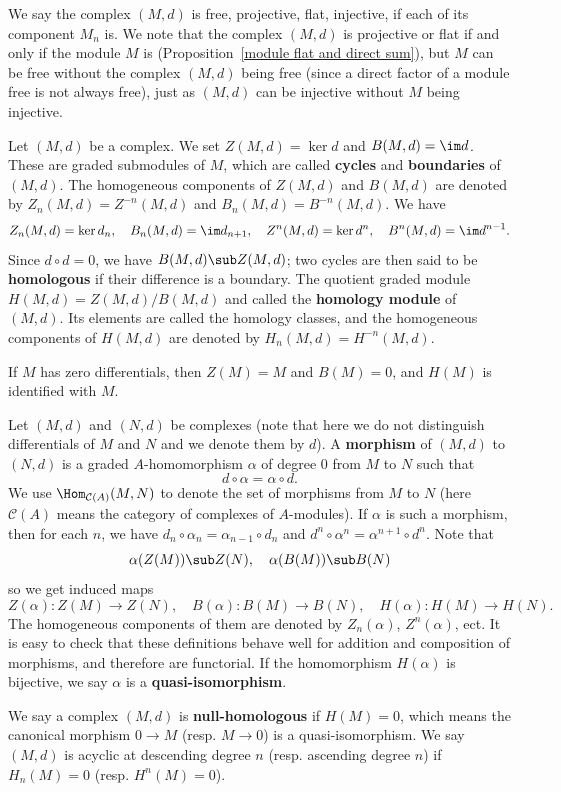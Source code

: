 We say the complex $(M,d)$ is free, projective, flat, injective, if each of its component $M_n$ is. We note that the complex $(M,d)$ is projective or flat if and only if the module $M$ is (Proposition~\ref{module flat and direct sum}), but $M$ can be free without the complex $(M,d)$ being free (since a direct factor of a module free is not always free), just as $(M,d)$ can be injective without $M$ being injective.\par
Let $(M,d)$ be a complex. We set $Z(M,d)=\ker d$ and $B(M,d)=\im d$. These are graded submodules of $M$, which are called \textbf{cycles} and \textbf{boundaries} of $(M,d)$. The homogeneous components of $Z(M,d)$ and $B(M,d)$ are denoted by $Z_n(M,d)=Z^{-n}(M,d)$ and $B_n(M,d)=B^{-n}(M,d)$. We have
\[Z_n(M,d)=\ker d_n,\quad B_n(M,d)=\im d_{n+1},\quad Z^n(M,d)=\ker d^n,\quad B^n(M,d)=\im d^{n-1}.\]
Since $d\circ d=0$, we have $B(M,d)\sub Z(M,d)$; two cycles are then said to be \textbf{homologous} if their difference is a boundary. The quotient graded module $H(M,d)=Z(M,d)/B(M,d)$ and called the \textbf{homology module} of $(M,d)$. Its elements are called the homology classes, and the homogeneous components of $H(M,d)$ are denoted by $H_n(M,d)=H^{-n}(M,d)$.
\begin{example}
If $M$ has zero differentials, then $Z(M)=M$ and $B(M)=0$, and $H(M)$ is identified with $M$.
\end{example}
Let $(M,d)$ and $(N,d)$ be complexes (note that here we do not distinguish differentials of $M$ and $N$ and we denote them by $d$). A \textbf{morphism} of $(M,d)$ to $(N,d)$ is a graded $A$-homomorphism $\alpha$ of degree $0$ from $M$ to $N$ such that
\[d\circ\alpha=\alpha\circ d.\]
We use $\Hom_{\mathcal{C}(A)}(M,N)$ to denote the set of morphisms from $M$ to $N$ (here $\mathcal{C}(A)$ means the category of complexes of $A$-modules). If $\alpha$ is such a morphism, then for each $n$, we have $d_n\circ\alpha_n=\alpha_{n-1}\circ d_n$ and $d^n\circ\alpha^n=\alpha^{n+1}\circ d^n$. Note that
\[\alpha(Z(M))\sub Z(N),\quad \alpha(B(M))\sub B(N)\]
so we get induced maps
\[Z(\alpha):Z(M)\to Z(N),\quad B(\alpha):B(M)\to B(N),\quad H(\alpha):H(M)\to H(N).\]
The homogeneous components of them are denoted by $Z_n(\alpha)$, $Z^n(\alpha)$, ect. It is easy to check that these definitions behave well for addition and composition of morphisms, and therefore are functorial. If the homomorphism $H(\alpha)$ is bijective, we say $\alpha$ is a \textbf{quasi-isomorphism}.\par
We say a complex $(M,d)$ is \textbf{null-homologous} if $H(M)=0$, which means the canonical morphism $0\to M$ (resp. $M\to 0$) is a quasi-isomorphism. We say $(M,d)$ is acyclic at descending degree $n$ (resp. ascending degree $n$) if $H_n(M)=0$ (resp. $H^n(M)=0$).\par

